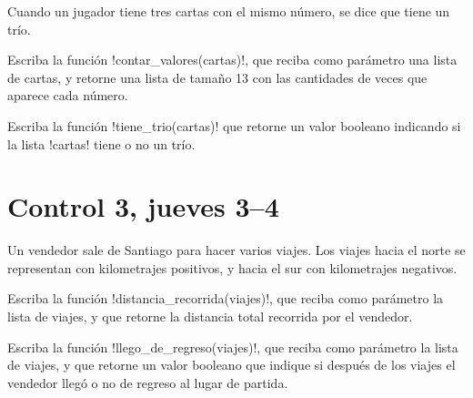 \documentclass[12pt,spanish,a5paper,landscape]{article}
\begin{document}
  Cuando un jugador tiene tres cartas con el mismo número,
  se dice que tiene un trío.

  Escriba la función \li!contar_valores(cartas)!,
  que reciba como parámetro una lista de cartas,
  y retorne una lista de tamaño 13
  con las cantidades de veces que aparece cada número.

  Escriba la función \li!tiene_trio(cartas)!
  que retorne un valor booleano
  indicando si la lista \li!cartas! tiene o no un trío.

  

  \newpage
  \part*{Control 3, jueves 3--4}
  \newpage

  Un vendedor sale de Santiago
  para hacer varios viajes.
  Los viajes hacia el norte
  se representan con kilometrajes positivos,
  y hacia el sur con kilometrajes negativos.

  Escriba la función \li!distancia_recorrida(viajes)!,
  que reciba como parámetro la lista de viajes,
  y que retorne la distancia total recorrida por el vendedor.

  Escriba la función \li!llego_de_regreso(viajes)!,
  que reciba como parámetro la lista de viajes,
  y que retorne un valor booleano
  que indique si después de los viajes
  el vendedor llegó o no de regreso al lugar de partida.

  
\end{document}
